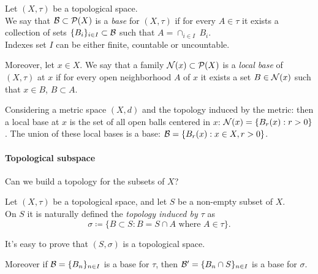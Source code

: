 \begin{defn}\label{base-topological-spaces}
	Let $(X, \tau)$ be a topological space.\\
	We say that $\mathcal B \subset \mathcal P(X)$ is a \emph{base} for $(X, \tau)$ if for every $A \in \tau$ it exists a collection of sets $\{ B_i \}_{i \in I} \subset \mathcal B$ such that $A = \cap_{i \in I} \ B_i$.\\
	Indexes set $I$ can be either finite, countable or uncountable.
	
	Moreover, let $x \in X$. We say that a family $\mathcal N(x) \subset \mathcal P(X)$ is a \emph{local base} of $(X, \tau)$ at $x$ if for every open neighborhood $A$ of $x$ it exists a set $B \in \mathcal N(x)$ such that $x \in B$, $B \subset A$.
\end{defn}



Considering a metric space $(X, d)$ and the topology induced by the metric: then a local base at $x$ is the set of all open balls centered in $x$: $\mathcal N(x) = \{ B_r(x) : r > 0 \}$. The union of these local bases is a base: $\mathcal B = \{ B_r(x) : x \in X, r > 0 \}$.

\paragraph{Topological subspace} Can we build a topology for the subsets of $X$?

\begin{defn}
	Let $(X, \tau)$ be a topological space, and let $S$ be a non-empty subset of $X$.\\
	On $S$ it is naturally defined the \emph{topology induced by $\tau$} as $$\sigma \coloneqq \{B \subset S: B = S\cap A \text{ where } A \in \tau\}.$$
\end{defn}

It's easy to prove that $(S, \sigma)$ is a topological space.

Moreover if $\mathcal B = \{B_n\}_{n \in I}$ is a base for $\tau$, then $\mathcal B' = \{B_n \cap S\}_{n \in I}$ is a base for $\sigma$.

